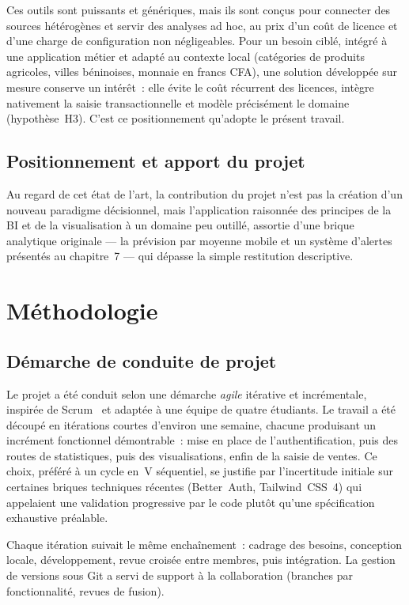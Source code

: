 \documentclass[11pt,a4paper]{report}
\begin{document}
Ces outils sont puissants et génériques, mais ils sont conçus pour connecter des
sources hétérogènes et servir des analyses ad hoc, au prix d'un coût de licence
et d'une charge de configuration non négligeables. Pour un besoin ciblé,
intégré à une application métier et adapté au contexte local (catégories de
produits agricoles, villes béninoises, monnaie en francs CFA), une solution
développée sur mesure conserve un intérêt~: elle évite le coût récurrent des
licences, intègre nativement la saisie transactionnelle et modèle précisément le
domaine (hypothèse~H3). C'est ce positionnement qu'adopte le présent travail.

\section{Positionnement et apport du projet}
Au regard de cet état de l'art, la contribution du projet n'est pas la création
d'un nouveau paradigme décisionnel, mais l'application raisonnée des principes de
la BI et de la visualisation à un domaine peu outillé, assortie d'une brique
analytique originale — la prévision par moyenne mobile et un système d'alertes
présentés au chapitre~7 — qui dépasse la simple restitution descriptive.

\chapter{Méthodologie}
\label{chap:methodo}

\section{Démarche de conduite de projet}
Le projet a été conduit selon une démarche \emph{agile} itérative et
incrémentale, inspirée de Scrum~\cite{schwaber2020scrum} et adaptée à une équipe
de quatre étudiants. Le travail a été découpé en itérations courtes d'environ
une semaine, chacune produisant un incrément fonctionnel démontrable~: mise en
place de l'authentification, puis des routes de statistiques, puis des
visualisations, enfin de la saisie de ventes. Ce choix, préféré à un cycle en~V
séquentiel, se justifie par l'incertitude initiale sur certaines briques
techniques récentes (Better~Auth, Tailwind~CSS~4) qui appelaient une validation
progressive par le code plutôt qu'une spécification exhaustive préalable.

Chaque itération suivait le même enchaînement~: cadrage des besoins, conception
locale, développement, revue croisée entre membres, puis intégration. La gestion
de versions sous Git a servi de support à la collaboration (branches par
fonctionnalité, revues de fusion).
\end{document}
